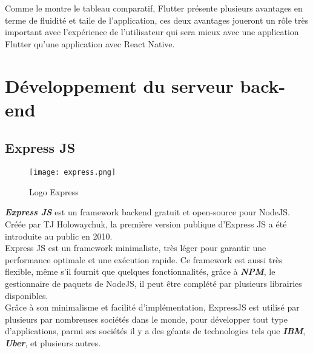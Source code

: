 Comme le montre le tableau comparatif, Flutter présente plusieurs avantages en terme de fluidité et taile de l'application, ces deux avantages joueront un rôle très important avec l'expérience de l'utilisateur qui sera mieux avec une application Flutter qu'une application avec React Native.


\section{Développement du serveur back-end}
\subsection{Express JS}
\vspace{1cm}
\begin{figure}[H]
    \centering
    \texttt{[image: express.png]}
    \vspace{1cm}
    \captionsetup{justification=centering}
    \caption{Logo Express}
    \label{fig:express_logo}
\end{figure}
\textit{\textbf{Express JS}} \cite{expressjs} est un framework backend gratuit et open-source pour NodeJS. Créée par TJ Holowaychuk, la première version publique d'Express JS a été introduite au public en 2010.\\
Express JS est un framework minimaliste, très léger pour garantir une performance optimale et une exécution rapide. Ce framework est aussi très flexible, même s'il fournit que quelques fonctionnalités, grâce à \textit{\textbf{NPM}}, le gestionnaire de paquets de NodeJS, il peut être complété par plusieurs librairies disponibles.\\
\noindent Grâce à son minimalisme et facilité d'implémentation, ExpressJS est utilisé par plusieurs par nombreuses sociétés dans le monde, pour développer tout type d'applications, parmi ses sociétés il y a des géants de technologies tels que \textit{\textbf{IBM}}, \textit{\textbf{Uber}}, et plusieurs autres.


